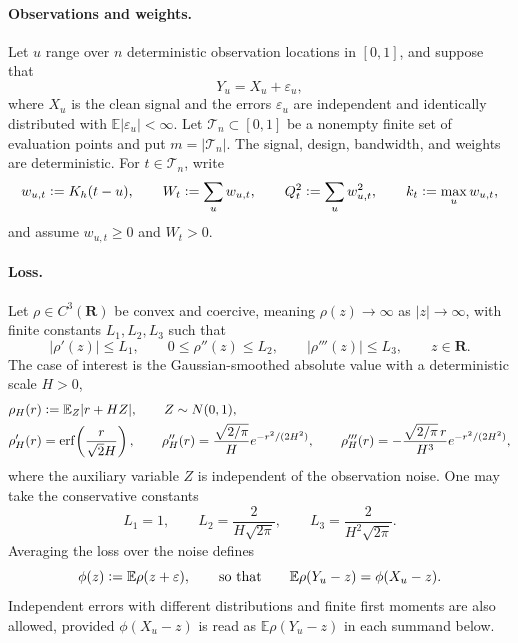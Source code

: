 \documentclass[11pt]{article}
\newcommand{\E}{\mathbb{E}}
\newcommand{\R}{\mathbf{R}}
\newcommand{\eqdef}{\mathrel{\vcentcolon=}}
\newcommand{\rhohu}{\rho}
\newcommand{\rhohum}{\phi}
\newcommand{\Kern}{K}
\newcommand{\Signal}{X}
\newcommand{\Data}{Y}
\theoremstyle{definition}
\begin{document}
\paragraph{Observations and weights.}
Let \(u\) range over \(n\) deterministic observation locations in \([0,1]\),
and suppose that
\[
  \Data_u=\Signal_u+\varepsilon_u,
\]
where \(\Signal_u\) is the clean signal and the errors \(\varepsilon_u\) are
independent and identically distributed with \(\E|\varepsilon_u|<\infty\).
Let \(\mathcal T_n\subset[0,1]\) be a nonempty finite set of evaluation points
and put \(m=|\mathcal T_n|\).  The signal, design, bandwidth, and weights are
deterministic.  For \(t\in\mathcal T_n\), write
\begin{equation}
  w_{u,t}\eqdef \Kern_h(t-u),\qquad
  W_t\eqdef\sum_u w_{u,t},\qquad
  Q_t^2\eqdef\sum_u w_{u,t}^2,\qquad
  k_t\eqdef\max_u w_{u,t},
  \label{eq:weights}
\end{equation}
and assume \(w_{u,t}\geq0\) and \(W_t>0\).

\paragraph{Loss.}
Let \(\rhohu\in C^3(\R)\) be convex and coercive, meaning
\(\rhohu(z)\to\infty\) as \(|z|\to\infty\), with finite constants
\(L_1,L_2,L_3\) such that
\begin{equation}
  |\rhohu'(z)|\leq L_1,\qquad
  0\leq\rhohu''(z)\leq L_2,\qquad
  |\rhohu'''(z)|\leq L_3,
  \qquad z\in\R.
  \label{eq:derivative-bounds}
\end{equation}
The case of interest is the Gaussian-smoothed absolute value with a
deterministic scale \(H>0\),
\begin{align}
  \rho_H(r)&\eqdef\E_Z|r+HZ|,\qquad Z\sim N(0,1),\notag\\
  \rho_H'(r)&=\operatorname{erf}\!\left(\frac{r}{\sqrt2H}\right),\qquad
  \rho_H''(r)=\frac{\sqrt{2/\pi}}{H}e^{-r^2/(2H^2)},\qquad
  \rho_H'''(r)=-\frac{\sqrt{2/\pi}\,r}{H^3}e^{-r^2/(2H^2)},
  \label{eq:smooth-abs}
\end{align}
where the auxiliary variable \(Z\) is independent of the observation noise.
One may take the conservative constants
\begin{equation}
  L_1=1,\qquad
  L_2=\frac{2}{H\sqrt{2\pi}},\qquad
  L_3=\frac{2}{H^2\sqrt{2\pi}}.
  \label{eq:rhoH-constants}
\end{equation}
Averaging the loss over the noise defines
\begin{equation}
  \rhohum(z)\eqdef\E\rhohu(z+\varepsilon),
  \qquad\text{so that}\qquad
  \E\rhohu(\Data_u-z)=\rhohum(\Signal_u-z).
  \label{eq:phi}
\end{equation}
Independent errors with different distributions and finite first moments are
also allowed, provided \(\rhohum(\Signal_u-z)\) is read as
\(\E\rhohu(\Data_u-z)\) in each summand below.
\end{document}
